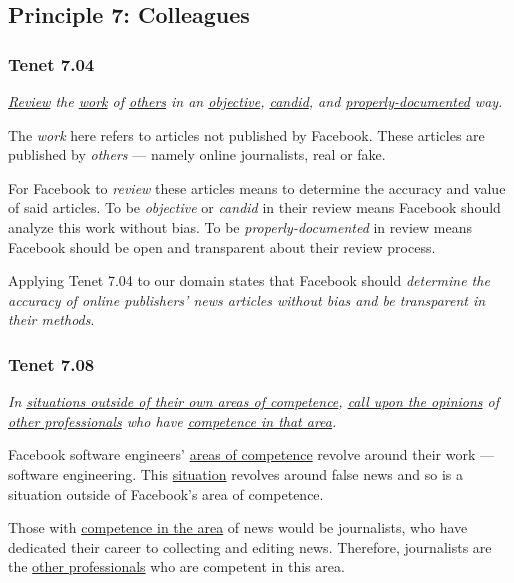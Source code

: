 

\subsection{Principle 7: Colleagues}

\subsubsection{Tenet 7.04}
\emph{\ul{Review} the \ul{work} of \ul{others} in an \ul{objective}, \ul{candid}, and \ul{properly-documented} way. \cite{se_code}}

\tenetmargin

\par The \emph{work} here refers to articles not published by Facebook. These articles are published by \emph{others} --- namely online journalists, real or fake.

\par For Facebook to \emph{review} these articles means to determine the accuracy and value of said articles. To be \emph{objective} or \emph{candid} in their review means Facebook should analyze this work without bias. To be \emph{properly-documented} in review means Facebook should be open and transparent about their review process. \cite{dictionary}


Applying Tenet 7.04 to our domain states that Facebook should \emph{determine the accuracy of online publishers' news articles without bias and be transparent in their methods}.

\subsubsection{Tenet 7.08}
\emph{In \ul{situations outside of their own areas of competence}, 
\ul{call upon the opinions} of \ul{other professionals} who have \ul{competence in that area}. \cite{se_code}}

\tenetmargin

\par Facebook software engineers' \ul{areas of competence} revolve around their work --- software engineering. This \ul{situation} revolves around false news and so is a situation outside of Facebook's area of competence.

\par Those with \ul{competence in the area} of news would be journalists, who have dedicated their career to collecting and editing news. \cite{dictionary} Therefore, journalists are the \ul{other professionals} who are competent in this area.


